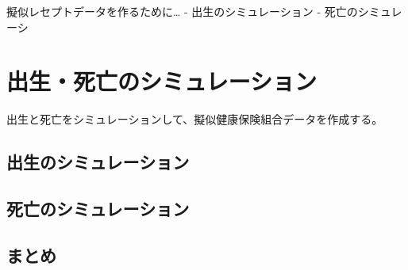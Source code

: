 \documentclass[
]{book}
\begin{document}
擬似レセプトデータを作るために\ldots{}
- 出生のシミュレーション
- 死亡のシミュレーシ

\hypertarget{ux51faux751fux6b7bux4ea1ux306eux30b7ux30dfux30e5ux30ecux30fcux30b7ux30e7ux30f3}{%
\section{出生・死亡のシミュレーション}\label{ux51faux751fux6b7bux4ea1ux306eux30b7ux30dfux30e5ux30ecux30fcux30b7ux30e7ux30f3}}

出生と死亡をシミュレーションして、擬似健康保険組合データを作成する。

\hypertarget{ux51faux751fux306eux30b7ux30dfux30e5ux30ecux30fcux30b7ux30e7ux30f3}{%
\subsection{出生のシミュレーション}\label{ux51faux751fux306eux30b7ux30dfux30e5ux30ecux30fcux30b7ux30e7ux30f3}}

\hypertarget{ux6b7bux4ea1ux306eux30b7ux30dfux30e5ux30ecux30fcux30b7ux30e7ux30f3}{%
\subsection{死亡のシミュレーション}\label{ux6b7bux4ea1ux306eux30b7ux30dfux30e5ux30ecux30fcux30b7ux30e7ux30f3}}

\hypertarget{ux307eux3068ux3081}{%
\subsection{まとめ}\label{ux307eux3068ux3081}}

  
\end{document}

